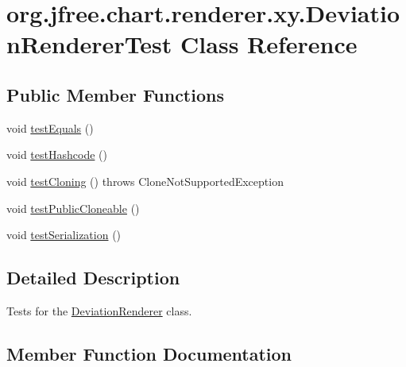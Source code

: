 \hypertarget{classorg_1_1jfree_1_1chart_1_1renderer_1_1xy_1_1_deviation_renderer_test}{}\section{org.\+jfree.\+chart.\+renderer.\+xy.\+Deviation\+Renderer\+Test Class Reference}
\label{classorg_1_1jfree_1_1chart_1_1renderer_1_1xy_1_1_deviation_renderer_test}
\subsection*{Public Member Functions}
\begin{DoxyCompactItemize}
\item 
void \mbox{\hyperlink{classorg_1_1jfree_1_1chart_1_1renderer_1_1xy_1_1_deviation_renderer_test_ada49f03ddc52168c13a93d9fdb1b8bbb}{test\+Equals}} ()
\item 
void \mbox{\hyperlink{classorg_1_1jfree_1_1chart_1_1renderer_1_1xy_1_1_deviation_renderer_test_a746f2fdf441fa1203be8b89e8e343cdf}{test\+Hashcode}} ()
\item 
void \mbox{\hyperlink{classorg_1_1jfree_1_1chart_1_1renderer_1_1xy_1_1_deviation_renderer_test_a881b22a8d800d657e7b4103928e07f1d}{test\+Cloning}} ()  throws Clone\+Not\+Supported\+Exception 
\item 
void \mbox{\hyperlink{classorg_1_1jfree_1_1chart_1_1renderer_1_1xy_1_1_deviation_renderer_test_af825e06e353e3f800f2f0fa84448065e}{test\+Public\+Cloneable}} ()
\item 
void \mbox{\hyperlink{classorg_1_1jfree_1_1chart_1_1renderer_1_1xy_1_1_deviation_renderer_test_a9561d3539f53afb52b7d26f287c2b970}{test\+Serialization}} ()
\end{DoxyCompactItemize}


\subsection{Detailed Description}
Tests for the \mbox{\hyperlink{classorg_1_1jfree_1_1chart_1_1renderer_1_1xy_1_1_deviation_renderer}{Deviation\+Renderer}} class. 

\subsection{Member Function Documentation}
\mbox{\label{classorg_1_1jfree_1_1chart_1_1renderer_1_1xy_1_1_deviation_renderer_test_a881b22a8d800d657e7b4103928e07f1d}} 
